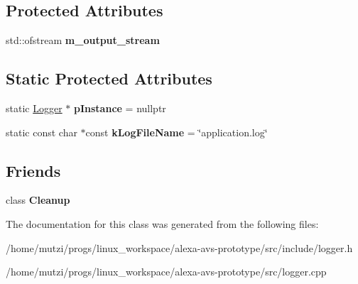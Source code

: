 \subsection*{Protected Attributes}
\begin{DoxyCompactItemize}
\item 
\mbox{\label{classLogger_a9cba5476c807435980221f095ba336ad}} 
std\+::ofstream {\bfseries m\+\_\+output\+\_\+stream}
\end{DoxyCompactItemize}
\subsection*{Static Protected Attributes}
\begin{DoxyCompactItemize}
\item 
\mbox{\label{classLogger_aa2b461b4d0dc897500899b57cc446ead}} 
static \hyperlink{classLogger}{Logger} $\ast$ {\bfseries p\+Instance} = nullptr
\item 
\mbox{\label{classLogger_a5d70bcbb122d00ecc958df45439b96f3}} 
static const char $\ast$const {\bfseries k\+Log\+File\+Name} = \char`\"{}application.\+log\char`\"{}
\end{DoxyCompactItemize}
\subsection*{Friends}
\begin{DoxyCompactItemize}
\item 
\mbox{\label{classLogger_ac3dfceef1470d020a70636b08149121a}} 
class {\bfseries Cleanup}
\end{DoxyCompactItemize}


The documentation for this class was generated from the following files\+:\begin{DoxyCompactItemize}
\item 
/home/mutzi/progs/linux\+\_\+workspace/alexa-\/avs-\/prototype/src/include/logger.\+h\item 
/home/mutzi/progs/linux\+\_\+workspace/alexa-\/avs-\/prototype/src/logger.\+cpp\end{DoxyCompactItemize}
